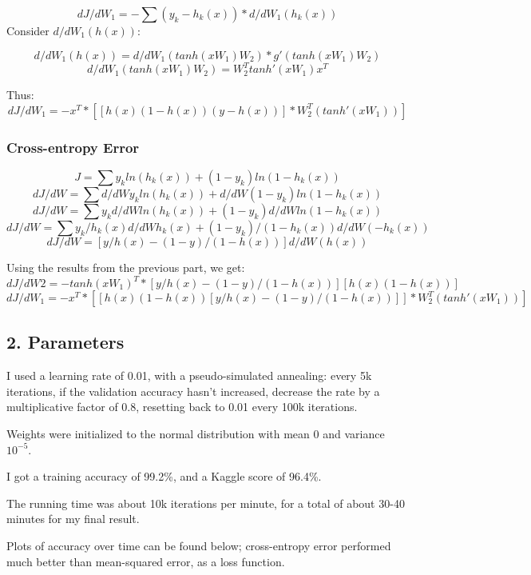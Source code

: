 \documentclass{article}
\begin{document}
\[dJ / dW_1 = - \sum (y_k - h_{k}(x)) * d/dW_1 (h_{k}(x))\] Consider
\(d/dW_1 (h(x))\):

\[d/dW_1 (h(x)) = d/dW_1 (tanh(xW_1)W_2) * g'(tanh(xW_1)W_2)\]
\[d/dW_1 (tanh(xW_1)W_2) = W_2^T tanh'(xW_1)x^T\]

Thus:
\[dJ / dW_1= - x^T * [[h(x)(1 - h(x))(y - h(x))] * W_2^T (tanh'(xW_1))] \]

\subsubsection{Cross-entropy Error}\label{cross-entropy-error}

\[J = \sum y_k ln(h_k(x)) + (1-y_k)ln(1-h_k(x))\]
\[dJ/dW = \sum d/dW y_k ln(h_k(x)) + d/dW (1-y_k)ln(1-h_k(x))\]
\[dJ/dW = \sum y_k d/dW ln(h_k(x)) +  (1-y_k)d/dWln(1-h_k(x))\]
\[dJ/dW = \sum y_k/h_k(x) d/dW h_k(x) + (1-y_k)/(1-h_k(x)) d/dW (-h_k(x))\]
\[dJ/dW = [y /h(x) - (1-y) /(1-h(x))] d/dW (h(x))\]

Using the results from the previous part, we get:
\[dJ/dW2 = - tanh(xW_1)^T * [y /h(x) - (1-y) /(1-h(x))][h(x) (1 - h(x))]\]
\[dJ / dW_1= - x^T * [[h(x)(1 - h(x))[y /h(x) - (1-y) /(1-h(x))]] * W_2^T (tanh'(xW_1))] \]

\subsection{2. Parameters}\label{parameters}

I used a learning rate of 0.01, with a pseudo-simulated annealing: every
5k iterations, if the validation accuracy hasn't increased, decrease the
rate by a multiplicative factor of 0.8, resetting back to 0.01 every
100k iterations.

Weights were initialized to the normal distribution with mean 0 and
variance \(10^{-5}\).

I got a training accuracy of 99.2\%, and a Kaggle score of 96.4\%.

The running time was about 10k iterations per minute, for a total of
about 30-40 minutes for my final result.

Plots of accuracy over time can be found below; cross-entropy error
performed much better than mean-squared error, as a loss function.
\end{document}
